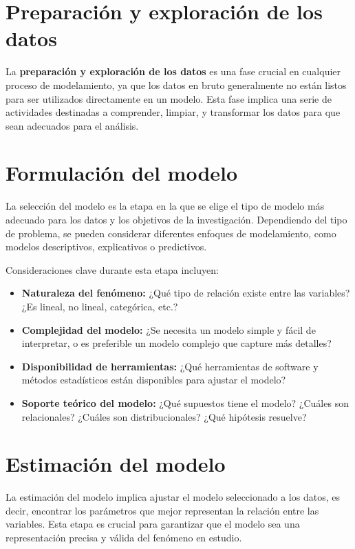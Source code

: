 \documentclass[
  letterpaper,
  DIV=11,
  numbers=noendperiod]{scrreprt}
\providecommand{\tightlist}{%
  \setlength{\itemsep}{0pt}\setlength{\parskip}{0pt}}\usepackage{longtable,booktabs,array}
\begin{document}
\section{Preparación y exploración de los
datos}\label{preparaciuxf3n-y-exploraciuxf3n-de-los-datos}

La \textbf{preparación y exploración de los datos} es una fase crucial
en cualquier proceso de modelamiento, ya que los datos en bruto
generalmente no están listos para ser utilizados directamente en un
modelo. Esta fase implica una serie de actividades destinadas a
comprender, limpiar, y transformar los datos para que sean adecuados
para el análisis.

\section{Formulación del modelo}\label{formulaciuxf3n-del-modelo}

La selección del modelo es la etapa en la que se elige el tipo de modelo
más adecuado para los datos y los objetivos de la investigación.
Dependiendo del tipo de problema, se pueden considerar diferentes
enfoques de modelamiento, como modelos descriptivos, explicativos o
predictivos.

Consideraciones clave durante esta etapa incluyen:

\begin{itemize}
\tightlist
\item
  \textbf{Naturaleza del fenómeno:} ¿Qué tipo de relación existe entre
  las variables? ¿Es lineal, no lineal, categórica, etc.?
\item
  \textbf{Complejidad del modelo:} ¿Se necesita un modelo simple y fácil
  de interpretar, o es preferible un modelo complejo que capture más
  detalles?
\item
  \textbf{Disponibilidad de herramientas:} ¿Qué herramientas de software
  y métodos estadísticos están disponibles para ajustar el modelo?
\item
  \textbf{Soporte teórico del modelo:} ¿Qué supuestos tiene el modelo?
  ¿Cuáles son relacionales? ¿Cuáles son distribucionales? ¿Qué hipótesis
  resuelve?
\end{itemize}

\section{Estimación del modelo}\label{estimaciuxf3n-del-modelo}

La estimación del modelo implica ajustar el modelo seleccionado a los
datos, es decir, encontrar los parámetros que mejor representan la
relación entre las variables. Esta etapa es crucial para garantizar que
el modelo sea una representación precisa y válida del fenómeno en
estudio.
\end{document}
